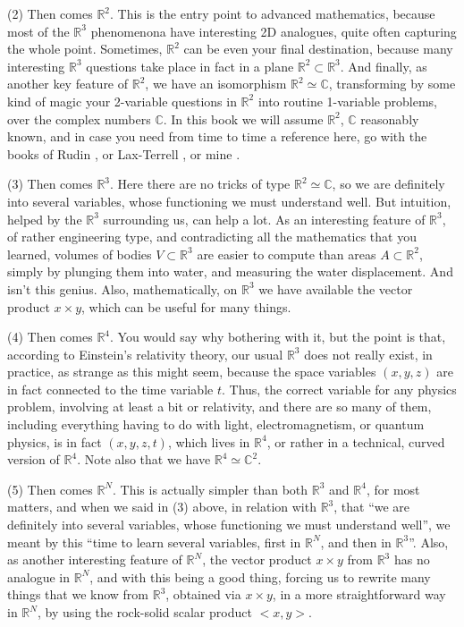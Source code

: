 \documentclass[12pt]{amsbook}
\begin{document}
\bigskip

(2) Then comes $\mathbb R^2$. This is the entry point to advanced mathematics, because most of the $\mathbb R^3$ phenomenona have interesting 2D analogues, quite often capturing the whole point. Sometimes, $\mathbb R^2$ can be even your final destination, because many interesting $\mathbb R^3$ questions take place in fact in a plane $\mathbb R^2\subset\mathbb R^3$. And finally, as another key feature of $\mathbb R^2$, we have an isomorphism $\mathbb R^2\simeq\mathbb C$, transforming by some kind of magic your 2-variable questions in $\mathbb R^2$ into routine 1-variable problems, over the complex numbers $\mathbb C$. In this book we will assume $\mathbb R^2$, $\mathbb C$ reasonably known, and in case you need from time to time a reference here, go with the books of Rudin \cite{ru2}, or Lax-Terrell \cite{lt2}, or mine \cite{ba1}.

\bigskip

(3) Then comes $\mathbb R^3$. Here there are no tricks of type $\mathbb R^2\simeq\mathbb C$, so we are definitely into several variables, whose functioning we must understand well. But intuition, helped by the $\mathbb R^3$ surrounding us, can help a lot. As an interesting feature of $\mathbb R^3$, of rather engineering type, and contradicting all the mathematics that you learned, volumes of bodies $V\subset\mathbb R^3$ are easier to compute than areas $A\subset\mathbb R^2$, simply by plunging them into water, and measuring the water displacement. And isn't this genius. Also, mathematically, on $\mathbb R^3$ we have available the vector product $x\times y$, which can be useful for many things.

\bigskip

(4) Then comes $\mathbb R^4$. You would say why bothering with it, but the point is that, according to Einstein's relativity theory, our usual $\mathbb R^3$ does not really exist, in practice, as strange as this might seem, because the space variables $(x,y,z)$ are in fact connected to the time variable $t$. Thus, the correct variable for any physics problem, involving at least a bit or relativity, and there are so many of them, including everything having to do with light, electromagnetism, or quantum physics, is in fact $(x,y,z,t)$, which lives in $\mathbb R^4$, or rather in a technical, curved version of $\mathbb R^4$. Note also that we have $\mathbb R^4\simeq\mathbb C^2$.

\bigskip

(5) Then comes $\mathbb R^N$. This is actually simpler than both $\mathbb R^3$ and $\mathbb R^4$, for most matters, and when we said in (3) above, in relation with $\mathbb R^3$, that ``we are definitely into several variables, whose functioning we must understand well'', we meant by this ``time to learn several variables, first in $\mathbb R^N$, and then in $\mathbb R^3$''. Also, as another interesting feature of $\mathbb R^N$, the vector product $x\times y$ from $\mathbb R^3$ has no analogue in $\mathbb R^N$, and with this being a good thing, forcing us to rewrite many things that we know from $\mathbb R^3$, obtained via $x\times y$, in a more straightforward way in $\mathbb R^N$, by using the rock-solid scalar product $<x,y>$.
\end{document}
